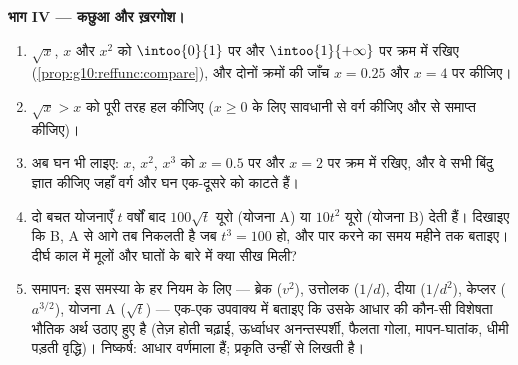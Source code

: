 \begin{problem}
\medskip
\noindent\textbf{भाग IV --- कछुआ और ख़रगोश।}
\begin{enumerate}[resume]
  \item $\sqrt x$, $x$ और $x^2$ को $\intoo{0}{1}$ पर और $\intoo{1}{+\infty}$ पर क्रम में रखिए
        (\cref{prop:g10:reffunc:compare}), और दोनों क्रमों की जाँच $x = 0.25$ और $x = 4$ पर कीजिए।
  \item $\sqrt x > x$ को पूरी तरह हल कीजिए ($x \geq 0$ के लिए सावधानी से वर्ग कीजिए
        और  से समाप्त कीजिए)।
  \item अब घन भी लाइए: $x$, $x^2$, $x^3$ को $x = 0.5$ पर और $x = 2$ पर क्रम
        में रखिए, और वे सभी बिंदु ज्ञात कीजिए जहाँ वर्ग और घन 
        एक-दूसरे को काटते हैं।
  \item दो बचत योजनाएँ $t$ वर्षों बाद $100\sqrt t$ यूरो (योजना A) या $10 t^2$
        यूरो (योजना B) देती हैं। दिखाइए कि B, A से आगे तब निकलती है जब
        $t^3 = 100$ हो, और पार करने का समय महीने तक बताइए। दीर्घ काल में मूलों
        और घातों के बारे में क्या सीख मिली?
  \item समापन: इस समस्या के हर नियम के लिए --- ब्रेक ($v^2$), उत्तोलक
        ($1/d$), दीया ($1/d^2$), केप्लर ($a^{3/2}$), योजना A ($\sqrt t$) --- एक-एक
        उपवाक्य में बताइए कि उसके आधार  की कौन-सी विशेषता भौतिक अर्थ
        उठाए हुए है (तेज़ होती चढ़ाई, ऊर्ध्वाधर अनन्तस्पर्शी, फैलता गोला,
        मापन-घातांक, धीमी पड़ती वृद्धि)। निष्कर्ष: आधार  वर्णमाला हैं;
        प्रकृति उन्हीं से लिखती है।
\end{enumerate}
\end{problem}
